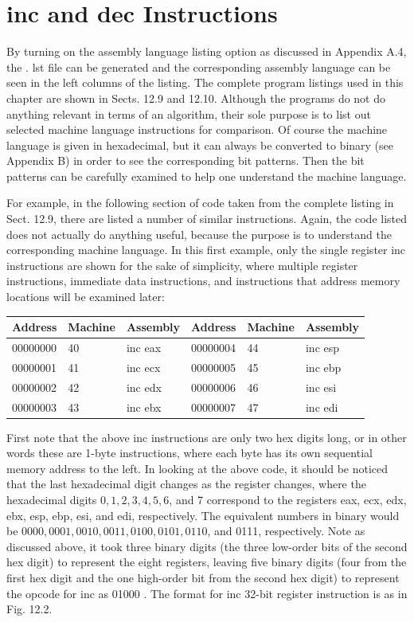 \documentclass[10pt]{book}
\begin{document}
\section{inc and dec Instructions}
By turning on the assembly language listing option as discussed in Appendix A.4, the . lst file can be generated and the corresponding assembly language can be seen in the left columns of the listing. The complete program listings used in this chapter are shown in Sects. 12.9 and 12.10. Although the programs do not do anything relevant in terms of an algorithm, their sole purpose is to list out selected machine language instructions for comparison. Of course the machine language is given in hexadecimal, but it can always be converted to binary (see Appendix B) in order to see the corresponding bit patterns. Then the bit patterns can be carefully examined to help one understand the machine language.

For example, in the following section of code taken from the complete listing in Sect. 12.9, there are listed a number of similar instructions. Again, the code listed does not actually do anything useful, because the purpose is to understand the corresponding machine language. In this first example, only the single register inc instructions are shown for the sake of simplicity, where multiple register instructions, immediate data instructions, and instructions that address memory locations will be examined later:

\begin{center}
\begin{tabular}{|l|l|l|l|l|l|}
\hline
Address & Machine & Assembly & Address & Machine & Assembly \\
\hline
00000000 & 40 & inc eax & 00000004 & 44 & inc esp \\
\hline
00000001 & 41 & inc ecx & 00000005 & 45 & inc ebp \\
\hline
00000002 & 42 & inc edx & 00000006 & 46 & inc esi \\
\hline
00000003 & 43 & inc ebx & 00000007 & 47 & inc edi \\
\hline
\end{tabular}
\end{center}

First note that the above inc instructions are only two hex digits long, or in other words these are 1-byte instructions, where each byte has its own sequential memory address to the left. In looking at the above code, it should be noticed that the last hexadecimal digit changes as the register changes, where the hexadecimal digits $0,1,2,3,4,5,6$, and 7 correspond to the registers eax, ecx, edx, ebx, esp, ebp, esi, and edi, respectively. The equivalent numbers in binary would be $0000,0001,0010,0011,0100,0101,0110$, and 0111, respectively. Note as discussed above, it took three binary digits (the three low-order bits of the second hex digit) to represent the eight registers, leaving five binary digits (four from the first hex digit and the one high-order bit from the second hex digit) to represent the opcode for inc as 01000 . The format for inc 32-bit register instruction is as in Fig. 12.2.
\end{document}
